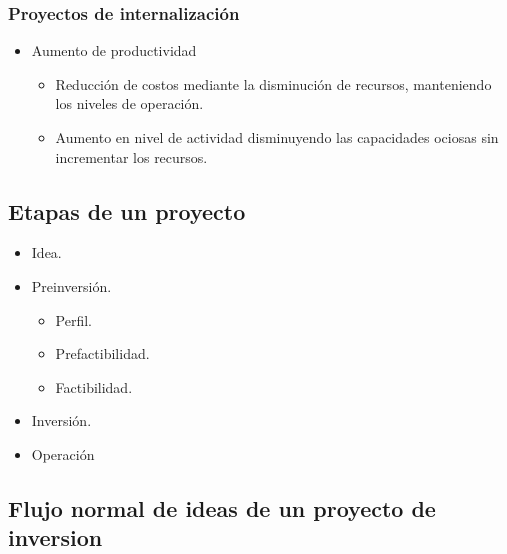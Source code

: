 \documentclass{templateNote}
\begin{document}
\subsubsection{Proyectos de internalización}
\begin{itemize}
    \item Aumento de productividad
    \begin{itemize}
        \item Reducción de costos mediante la disminución de recursos, manteniendo los niveles de operación.
        \item Aumento en nivel de actividad disminuyendo las capacidades ociosas sin incrementar los recursos.
    \end{itemize}
\end{itemize}

\subsection{Etapas de un proyecto}
\begin{itemize}
    \item Idea.
    \item Preinversión.
    \begin{itemize}
        \item Perfil.
        \item Prefactibilidad.
        \item Factibilidad.
    \end{itemize}
    \item Inversión.
    \item Operación
\end{itemize}

\subsection{Flujo normal de ideas de un proyecto de inversion}
\end{document}
